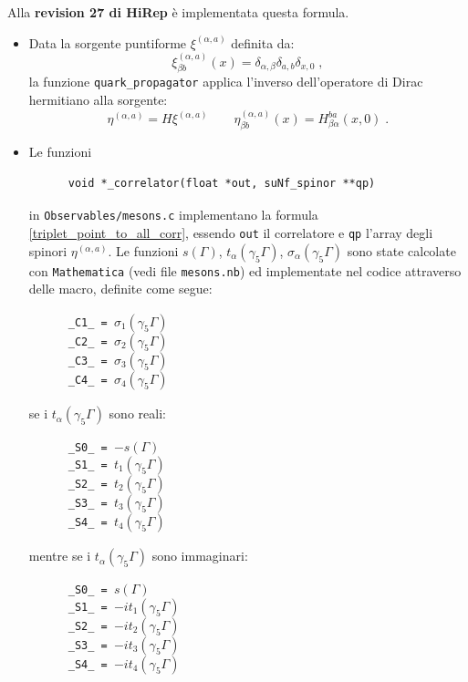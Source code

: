 \documentclass[a4paper]{article}
\newcommand{\point}{\; .}
\newcommand{\comma}{\; ,}
\begin{document}
Alla \textbf{revision 27 di HiRep} \`{e} implementata questa formula.
\begin{itemize}
\item Data la sorgente puntiforme $ \xi^{(\alpha,a)} $ definita da:
$$ \xi^{(\alpha,a)}_{\beta b}(x) = \delta_{\alpha,\beta} \delta_{a,b} \delta_{x,0} \comma $$
la funzione \verb|quark_propagator| applica l'inverso dell'operatore di Dirac hermitiano alla sorgente:
$$ \eta^{(\alpha,a)} = H \xi^{(\alpha,a)} \qquad \eta^{(\alpha,a)}_{\beta b}(x) = H_{\beta \alpha}^{b a}(x,0) \point $$
\item Le funzioni\\
\verb|      |\\
\verb|      void *_correlator(float *out, suNf_spinor **qp)|\\
\verb|      |\\
in \verb|Observables/mesons.c| implementano la formula \ref{triplet_point_to_all_corr}, essendo \verb|out| il correlatore e \verb|qp| l'array degli spinori $\eta^{(\alpha,a)}$. Le funzioni $s(\Gamma)$, $t_\alpha(\gamma_5 \Gamma)$, $\sigma_\alpha(\gamma_5 \Gamma)$ sono state calcolate con \verb|Mathematica| (vedi file \verb|mesons.nb|) ed implementate nel codice attraverso delle macro, definite come segue:\\
\verb|      |\\
\verb|      _C1_ = |$\sigma_1(\gamma_5 \Gamma)$\\
\verb|      _C2_ = |$\sigma_2(\gamma_5 \Gamma)$\\
\verb|      _C3_ = |$\sigma_3(\gamma_5 \Gamma)$\\
\verb|      _C4_ = |$\sigma_4(\gamma_5 \Gamma)$\\
\verb|      |\\
se i $t_\alpha(\gamma_5 \Gamma)$ sono reali:\\
\verb|      |\\
\verb|      _S0_ = |$-s(\Gamma)$\\
\verb|      _S1_ = |$t_1(\gamma_5 \Gamma)$\\
\verb|      _S2_ = |$t_2(\gamma_5 \Gamma)$\\
\verb|      _S3_ = |$t_3(\gamma_5 \Gamma)$\\
\verb|      _S4_ = |$t_4(\gamma_5 \Gamma)$\\
\verb|      |\\
mentre se i $t_\alpha(\gamma_5 \Gamma)$ sono immaginari:\\
\verb|      |\\
\verb|      _S0_ = |$s(\Gamma)$\\
\verb|      _S1_ = |$-i t_1(\gamma_5 \Gamma)$\\
\verb|      _S2_ = |$-i t_2(\gamma_5 \Gamma)$\\
\verb|      _S3_ = |$-i t_3(\gamma_5 \Gamma)$\\
\verb|      _S4_ = |$-i t_4(\gamma_5 \Gamma)$\\
\verb|      |\\
\end{itemize}
\end{document}
